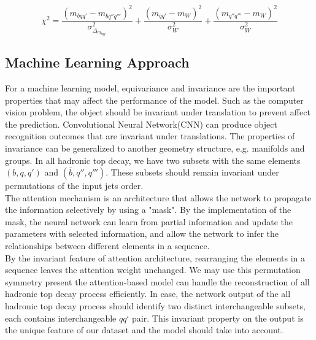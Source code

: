\begin{equation}\label{eqn:chi2}
	\chi^{2} = \frac{(m_{bqq'} - m_{\bar{b}q''q'''})^{2}}{\sigma^{2}_{\Delta_{m_{bqq'}}}}  + \frac{(m_{qq'} - m_{W})^{2}}{\sigma^{2}_{W}} + \frac{(m _{q''q'''} - m_{W})^{2}}{\sigma^{2}_{W}}
\end{equation} 


\subsection{Machine Learning Approach}\label{subsec:ML approach}

For a machine learning model, equivariance and invariance are the important properties that may affect the performance of the model. Such as the computer vision problem, the object should be invariant under translation to prevent affect the prediction. Convolutional Neural Network(CNN) can produce object recognition outcomes that are invariant under translations. The properties of invariance can be generalized to another geometry structure, e.g. manifolds and groups. In all hadronic top decay, we have two subsets with the same elements $(b, q, q')$ and $(\bar{b}, q'', q''')$. These subsets should remain invariant under permutations of the input jets order. 
\\
The attention mechanism is an architecture that allows the network to propagate the information selectively by using a "mask". By the implementation of the mask, the neural network can learn from partial information and update the parameters with selected information, and allow the network to infer the relationships between different elements in a sequence.
\\
By the invariant feature of attention architecture, rearranging the elements in a sequence leaves the attention weight unchanged. We may use this permutation symmetry present the attention-based model can handle the reconstruction of all hadronic top decay process efficiently. In case, the network output of the all hadronic top decay process should identify two distinct interchangeable subsets, each contains interchangeable $qq‘$ pair. This invariant property on the output is the unique feature of our dataset and the model should take into account. 
\\

